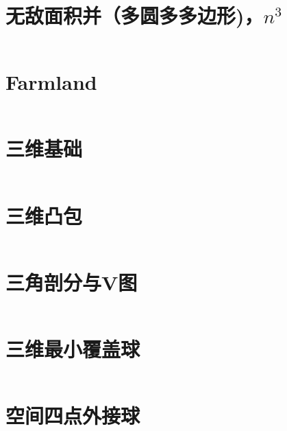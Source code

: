 \section{无敌面积并（多圆多多边形)，$n^3$}
\inputminted{cpp}{\source/computational-geometry/area_union.cpp}
\section{Farmland}
\inputminted{cpp}{\source/computational-geometry/farmland.cpp}
\section{三维基础}
\inputminted{cpp}{\source/computational-geometry/3DGeo.cpp}
\section{三维凸包}
\inputminted{cpp}{\source/computational-geometry/3DConvex.cpp}
\section{三角剖分与V图}
\inputminted{cpp}{\source/computational-geometry/DelaunayTriangulation.cpp}
\section{三维最小覆盖球}
\inputminted{cpp}{\source/computational-geometry/minimum-coverage-ball.cpp}
\section{空间四点外接球}
\inputminted{cpp}{\source/computational-geometry/min_ball.cpp}
